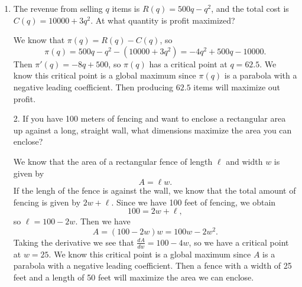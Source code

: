 \documentclass[11pt]{article}
\begin{document}
\pagestyle{empty}
\newsavebox{\quizfront}
\begin{lrbox}{\quizfront}
\begin{minipage}[top][4.5in][t]{\textwidth} \setlength{\parindent}{1.5em}
\drawtitle
\vspace{-0.5in}
\begin{enumerate}

\item The revenue from selling $q$ items is $R(q) = 500q - q^2$, and
  the total cost is $C(q) = 10000 + 3q^2$. At what quantity is profit
  maximized?

  \vfill
  {\color{blue}

    We know that $\pi(q) = R(q) - C(q)$, so
    \[
    \pi(q) = 500q - q^2 - (10000 + 3q^2) = -4q^2 + 500q - 10000.
    \]
    Then $\pi'(q) = -8q + 500$, so $\pi(q)$ has a critical point at $q
    = 62.5$. We know this critical point is a global maximum since
    $\pi(q)$ is a parabola with a negative leading coefficient. Then
    producing $62.5$ items will maximize out profit.

  }
  \vfill

\end{enumerate}


\end{minipage}
\end{lrbox}

\newsavebox{\quizback}
\begin{lrbox}{\quizback}
\begin{minipage}[top][4.5in][t]{\textwidth} \setlength{\parindent}{1.5em}
\begin{enumerate}
\item[2.] If you have 100 meters of fencing and want to enclose a
  rectangular area up against a long, straight wall, what dimensions
  maximize the area you can enclose?

  \vfill
  {\color{blue}

    We know that the area of a rectangular fence of length $\ell$ and
    width $w$ is given by
    \[
    A = \ell w.
    \]
    If the lengh of the fence is against the wall, we know that the
    total amount of fencing is given by $2w + \ell$. Since we have 100
    feet of fencing, we obtain
    \[
    100 = 2w + \ell,
    \]
    so $\ell = 100 - 2w$. Then we have
    \[
    A = (100-2w)w = 100w - 2w^2.
    \]
    Taking the derivative we see that $\frac{dA}{dw} = 100 - 4w$, so
    we have a critical point at $w = 25$. We know this critical point
    is a global maximum since $A$ is a parabola with a negative
    leading coefficient. Then a fence with a width of 25 feet and a
    length of 50 feet will maximize the area we can enclose.

  }
  \vfill

\end{enumerate}
\end{minipage}
\end{lrbox}
\end{document}
